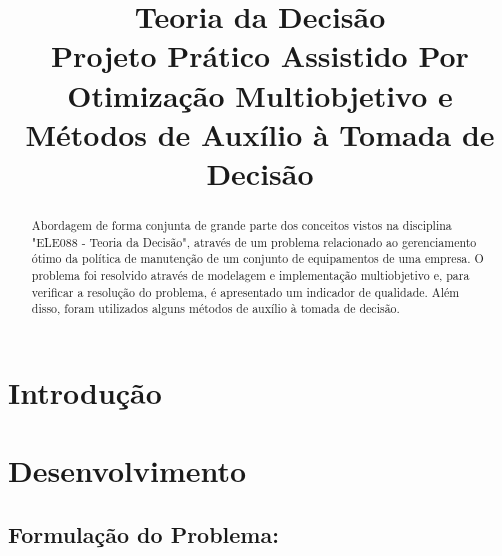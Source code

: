 \documentclass[conference]{IEEEtran}
\begin{document}
\title{Teoria da Decisão\\Projeto Prático Assistido Por Otimização Multiobjetivo e Métodos de Auxílio à Tomada de Decisão}


\author{
\and
{}
\and
{}
}

\maketitle

\begin{abstract}
Abordagem de forma conjunta de grande parte dos conceitos vistos na disciplina "ELE088 - Teoria da Decisão", através de um problema relacionado ao gerenciamento ótimo da política de manutenção de um conjunto de equipamentos de uma empresa. O problema foi resolvido através de modelagem e implementação multiobjetivo e, para verificar a resolução do problema, é apresentado um indicador de qualidade. Além disso, foram utilizados alguns métodos de auxílio à tomada de decisão.
\end{abstract}

\IEEEpeerreviewmaketitle

\section{Introdução}


\section{Desenvolvimento}
\subsection{Formulação do Problema:}

\end{document}
